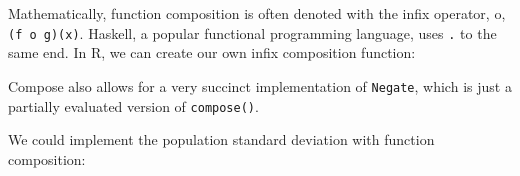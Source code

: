 Mathematically, function composition is often denoted with the infix
operator, o, \texttt{(f o g)(x)}. Haskell, a popular functional
programming language, uses \texttt{.} to the same end. In R, we can
create our own infix composition function: 

\begin{Shaded}
\end{Shaded}

Compose also allows for a very succinct implementation of
\texttt{Negate}, which is just a partially evaluated version of
\texttt{compose()}. 

\begin{Shaded}
\begin{Highlighting}[]
\StringTok{ }\DataTypeTok{!}\NormalTok{)}
\end{Highlighting}
\end{Shaded}

We could implement the population standard deviation with function
composition:

\begin{Shaded}
\end{Shaded}

